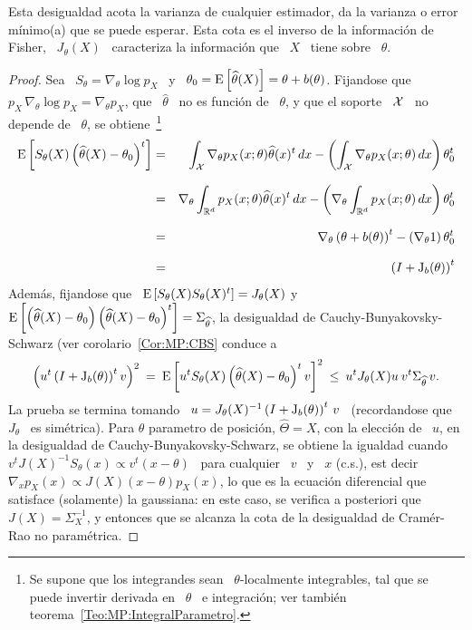 %
\noindent Esta desigualdad  acota la varianza de cualquier  estimador, \ie da la
varianza o error m\'inimo(a) que se puede esperar. Esta cota es el inverso de la
informaci\'on de Fisher, \ie \  $J_\theta(X)$ \ caracteriza la informaci\'on que
\ $X$ \ tiene sobre \ $\theta$.
%
\begin{proof}
  Sea  \   $S_\theta  =  \nabla_\theta  \log   p_X$  \  y  \   $\theta_0  =  \operatorname{E}\left[
    \widehat{\theta}(X) \right] = \theta +  b(\theta)$.  Fijandose que \ $p_X \,
  \nabla_\theta \log p_X = \nabla_\theta  p_X$, que \ $\widehat{\theta}$ \ no es
  funci\'on de \ $\theta$,  y que el soporte \ $\mathcal{X}$ \  no depende de \ $\theta$,
  se obtiene~\footnote{Se supone que  los integrandes sean \ $\theta$-localmente
    integrables,  tal  que  se  puede  invertir  derivada  en  \  $\theta$  \  e
    integraci\'on;    ver    tambi\'en    teorema~\ref{Teo:MP:IntegralParametro}.}
  \begin{eqnarray*}
  \operatorname{E}\left[ S_\theta(X) \left( \widehat{\theta}(X) - \theta_0 \right)^t \right] & = &
  \int_{\mathcal{X}} \nabla_\theta p_X(x;\theta) \widehat{\theta}(x)^t \, dx - \left(
  \int_{\mathcal{X}} \nabla_\theta p_X(x;\theta) \, dx \right) \theta_0^t\\[2.5mm]
  & = & \nabla_\theta \int_{\mathbb{R}^d} p_X(x;\theta) \widehat{\theta}(x)^t \, dx -
  \left( \nabla_\theta \int_{\mathbb{R}^d} p_X(x;\theta) \, dx \right)
  \theta_0^t\\[2.5mm]
  & = & \nabla_\theta \left( \theta + b(\theta) \right)^t  - 
  \left( \nabla_\theta 1 \right) \theta_0^t\\[2.5mm]
  & = & \left( I + \operatorname{J}_b(\theta) \right)^t
  \end{eqnarray*}
  Adem\'as, fijandose  que \  $\operatorname{E}\left[ S_\theta(X) S_\theta(X)^t  \right] =  J_\theta(X)$ y
  $\operatorname{E}\left[   \left(    \widehat{\theta}(X)   -   \theta_0    \right)   \left(
      \widehat{\theta}(X)      -      \theta_0      \right)^t     \right]      =
  \Sigma_{\widehat{\theta}}$, la  desigualdad de Cauchy-Bunyakovsky-Schwarz (ver
  corolario~\ref{Cor:MP:CBS}
  conduce a
  \[
  \left( u^t \left( I + \operatorname{J}_b(\theta)  \right)^t v \right)^2 \: = \: \operatorname{E}\left[
    u^t S_\theta(X) \left( \widehat{\theta}(X) -  \theta_0 \right)^t v \right]^2 \: \le
  \: u^t J_\theta(X) u \: v^t \Sigma_{\widehat{\theta}} \, v.
  \]
  La prueba se termina tomando \ $u = J_\theta(X)^{-1} \left( I + \operatorname{J}_b(\theta)
  \right)^t \,  v$ \ (recordandose  que \ $J_\theta$ \  es sim\'etrica).\newline
  Para  $\theta$  parametro  de  posici\'on,  $\widehat{\Theta}  =  X$,  con  la
  elecci\'on  de \  $u$,  en la  desigualdad  de Cauchy-Bunyakovsky-Schwarz,  se
  obtiene la igualdad  cuando \ $v^t J(X)^{-1} S_\theta(x) \propto v^t  (x - \theta)$ \
  para cualquier \ $v$  \ y \ $x$ (c.s.), est decir  \ $\nabla_x p_X (x) \propto
  J(X) (x -  \theta) p_X(x)$, lo que es la  ecuaci\'on diferencial que satisface
  (solamente) la gaussiana: en este caso, se verifica a posteriori que \ $J(X) =
  \Sigma_X^{-1}$,  y  entonces que  se  alcanza la  cota  de  la desigualdad  de
  Cram\'er-Rao no param\'etrica.
\end{proof}
